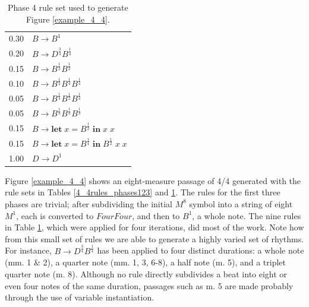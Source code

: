 \documentclass{article}
\begin{document}
\begin{table}
\centering
\begin{tabular}{ll}
0.30 & $B \rightarrow B^1$\\
0.20 & $B \rightarrow D^\frac{3}{4} B^\frac{1}{4}$\\
0.15 & $B \rightarrow B^\frac{1}{2} B^\frac{1}{2}$\\
0.10 & $B \rightarrow B^\frac{1}{2} B^\frac{1}{4} B^\frac{1}{4}$\\
0.05 & $B \rightarrow B^\frac{1}{4} B^\frac{1}{2} B^\frac{1}{4}$\\
0.05 & $B \rightarrow B^\frac{1}{3} B^\frac{1}{3} B^\frac{1}{3}$\\
0.15 & $B \rightarrow \textbf{let} \; x = B^\frac{1}{2} \; \textbf{in} \; x \; x$\\ 
0.15 & $B \rightarrow \textbf{let} \; x = B^\frac{1}{4} \; \textbf{in} \; B^\frac{1}{2} \; x \; x$\\ 
1.00 & $D \rightarrow D^1$\\
\end{tabular}
\caption{Phase 4 rule set used to generate Figure \ref{example_4_4}.}\label{4_4rules}
\end{table}

Figure \ref{example_4_4} shows an eight-measure passage of 4/4 generated with the rule sets in Tables \ref{4_4rules_phases123} and \ref{4_4rules}. The rules for the first three phases are trivial; after subdividing the initial $M^8$ symbol into a string of eight $M^1$, each is converted to $FourFour$, and then to $B^1$, a whole note. The nine rules in Table \ref{4_4rules}, which were applied for four iterations, did most of the work. Note how from this small set of rules we are able to generate a highly varied set of rhythms. For instance, $B \rightarrow D^\frac{3}{4} B^\frac{1}{4}$ has been applied to four distinct durations: a whole note (mm. 1 \& 2), a quarter note (mm. 1, 3, 6-8), a half note (m. 5), and a triplet quarter note (m. 8). Although no rule directly subdivides a beat into eight or even four notes of the same duration, passages such as m. 5 are made probably through the use of variable instantiation.
\end{document}
